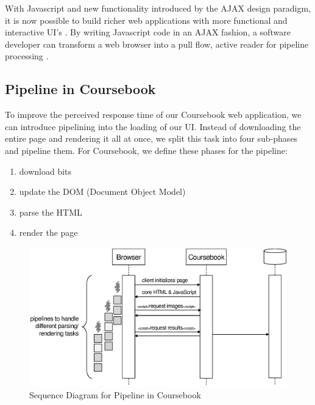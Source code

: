With Javascript and new functionality introduced by the AJAX design paradigm,
it is now possible to build richer web applications with more functional and
interactive UI's \cite{Crane05}. By writing Javascript code in an AJAX fashion,
a software developer can transform a web browser into a pull flow, active reader
for pipeline processing \cite{Vermeulen95}.

\subsection{Pipeline in Coursebook}

To improve the perceived response time of our Coursebook web application, we can
introduce pipelining into the loading of our UI. Instead of downloading the
entire page and rendering it all at once, we split this task into four 
sub-phases and pipeline them. For Coursebook, we define these phases for the
pipeline:

\singlespacing
\begin{enumerate}
  \item download bits
  \item update the DOM (Document Object Model)
  \item parse the HTML
  \item render the page
\end{enumerate}
\doublespacing

\begin{figure}[t]
  \begin{center}
  \includegraphics[width=\textwidth]{images/pipesequence}
  \caption{Sequence Diagram for Pipeline in Coursebook}
  \label{fig:pipesequence}
  \end{center}
\end{figure}

